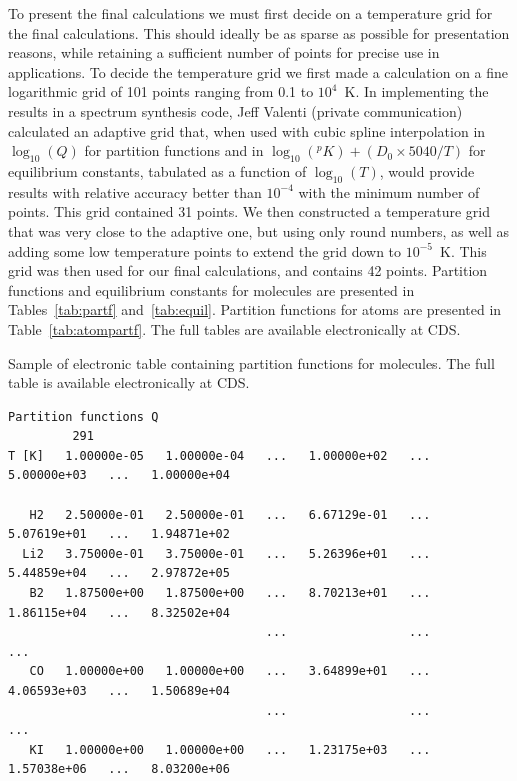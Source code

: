 \documentclass[traditabstract]{aa} %
\begin{document}
To present the final calculations we must first decide on a temperature grid for the final calculations.  This should ideally be as sparse as possible for presentation reasons, while retaining a sufficient number of points for precise use in applications.  To decide the temperature grid we first made a calculation on a fine logarithmic grid of 101 points ranging from 0.1 to $10^4$~K.  In implementing the results in a spectrum synthesis code, Jeff Valenti (private communication) calculated an adaptive grid that, when used with cubic spline interpolation in $\log_{10}(Q)$ for partition functions and in $\log_{10}(^pK)+(D_0\times 5040/T)$ for equilibrium constants, tabulated as a function of $\log_{10}(T)$, would provide results with relative accuracy better than $10^{-4}$ with the minimum number of points.  This grid contained 31 points.  We then constructed a temperature grid that was very close to the adaptive one, but using only round numbers, as well as adding some low temperature points to extend the grid down to $10^{-5}$~K.  This grid was then used for our final calculations, and contains 42 points.  Partition functions and equilibrium constants for molecules are presented in Tables~\ref{tab:partf} and~\ref{tab:equil}.  Partition functions for atoms are presented in Table~\ref{tab:atompartf}.  The full tables are available electronically at CDS.

\begin{table}
\begin{center}
\caption{Sample of electronic table containing partition functions for molecules. The full table is available electronically at CDS.}
\label{tab:partf}
\scriptsize
\begin{verbatim}
Partition functions Q
         291
T [K]   1.00000e-05   1.00000e-04   ...   1.00000e+02   ...   5.00000e+03   ...   1.00000e+04

   H2   2.50000e-01   2.50000e-01   ...   6.67129e-01   ...   5.07619e+01   ...   1.94871e+02
  Li2   3.75000e-01   3.75000e-01   ...   5.26396e+01   ...   5.44859e+04   ...   2.97872e+05
   B2   1.87500e+00   1.87500e+00   ...   8.70213e+01   ...   1.86115e+04   ...   8.32502e+04
                                    ...                 ...                 ...
   CO   1.00000e+00   1.00000e+00   ...   3.64899e+01   ...   4.06593e+03   ...   1.50689e+04
                                    ...                 ...                 ...
   KI   1.00000e+00   1.00000e+00   ...   1.23175e+03   ...   1.57038e+06   ...   8.03200e+06
\end{verbatim}
\end{center}
\end{table} 
\end{document}
